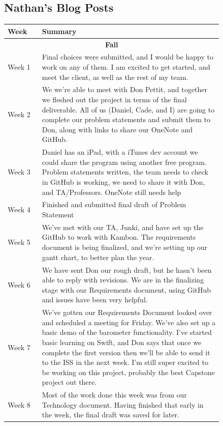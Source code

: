 \documentclass[onecolumn, draftclsnofoot,10pt, compsoc]{IEEEtran}
\begin{document}
\subsection{Nathan's Blog Posts}
\begin{center}
	\begin{longtable}{| l | p{0.84\linewidth}|}
		\hline
	Week & Summary \\ \hline
    \multicolumn{2}{c}{\textbf{Fall}} \\ \hline
    Week 1 & Final choices were submitted, and I would be happy to work on any of them.  I am excited to get started, and meet the client, as well as the rest of my team.  \\ \hline
	Week 2 & We we're able to meet with Don Pettit, and together we fleshed out the project in terms of the final deliverable.  All of us (Daniel, Cade, and I) are going to complete our problem statements and submit them to Don, along with links to share our OneNote and GitHub.  \\ \hline
	Week 3 & Daniel has an iPad, with a iTunes dev account we could share the program using another free program. Problem statements written, the team needs to check in GitHub is working, we need to share it with Don, and TA/Professors. OneNote still needs help  \\ \hline
	Week 4 & Finished and submitted final draft of Problem Statement \\ \hline
    Week 5 & We've met with our TA, Junki, and have set up the GitHub to work with Kambon.  The requirements document is being finalized, and we're setting up our gantt chart, to better plan the year. \\ \hline
    Week 6 & We have sent Don our rough draft, but he hasn't been able to reply with revisions. We are in the finalizing stage with our Requirements document, using GitHub and issues have been very helpful. \\ \hline
	Week 7 & We've gotten our Requirements Document looked over and scheduled a meeting for Friday.  We've also set up a basic demo of the barometer functionality.  I've started basic learning on Swift, and Don says that once we complete the first version then we'll be able to send it to the ISS in the next week.  I’m still super excited to be working on this project, probably the best Capstone project out there.  \\ \hline
	Week 8 & Most of the work done this week was from our Technology document.  Having finished that early in the week, the final draft was saved for later. \\ \hline

\end{longtable}
\end{center}
\end{document}

